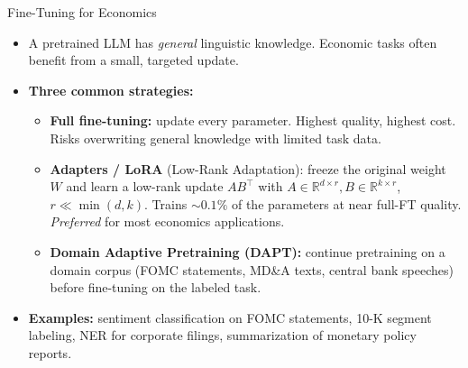 \begin{frame}{Fine-Tuning for Economics}
\begin{itemize}
\item A pretrained LLM has \emph{general} linguistic knowledge. Economic tasks often benefit from a small, targeted update.

\medskip
\item \textbf{Three common strategies:}
\begin{itemize}
    \item \textbf{Full fine-tuning:} update every parameter. Highest quality, highest cost. Risks overwriting general knowledge with limited task data.
    \medskip
    \item \textbf{Adapters / LoRA} (Low-Rank Adaptation): freeze the original weight $W$ and learn a low-rank update $A B^{\top}$ with $A \in \mathbb{R}^{d \times r}, B \in \mathbb{R}^{k \times r}$, $r \ll \min(d,k)$. Trains $\sim 0.1\%$ of the parameters at near full-FT quality. \emph{Preferred} for most economics applications.
    \medskip
    \item \textbf{Domain Adaptive Pretraining (DAPT):} continue pretraining on a domain corpus (FOMC statements, MD\&A texts, central bank speeches) before fine-tuning on the labeled task.
\end{itemize}

\medskip
\item \textbf{Examples:} sentiment classification on FOMC statements, 10-K segment labeling, NER for corporate filings, summarization of monetary policy reports.
\end{itemize}
\end{frame}

